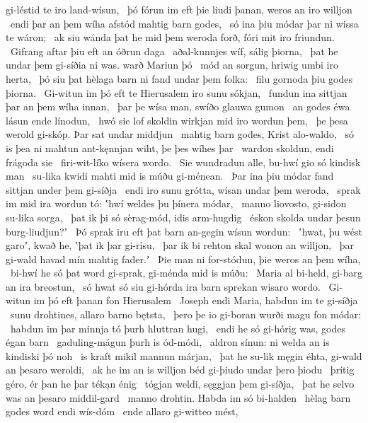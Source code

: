 gi-léstid te iro land-wísun, \hld\ þó fórun im eft þie liudi þanan,
weros an iro willjon \hld\ endi þar an þem wíha afstód
mahtig barn godes, \hld\ só ina þiu módar þar
ni wissa te wáron; \hld\ ak siu wánda þat he mid þem weroda forð,
fóri mit iro friundun. \hld\ Gifrang aftar þiu
eft an óðrun daga \hld\ aðal-kunnjes wíf,
sálig þiorna, \hld\ þat he undar þem gi-síðia ni was.
warð Mariun þó \hld\ mód an sorgun,
hriwig umbi iro herta, \hld\ þó siu þat hèlaga barn
ni fand undar þem folka: \hld\ filu gornoda
þiu godes þiorna. \hld\ Gi-witun im þó eft te Hierusalem
iro sunu sókjan, \hld\ fundun ina sittjan þar
an þem wíha innan, \hld\ þar þe wísa man,
swíðo glauwa gumon \hld\ an godes éwa
lásun ende línodun, \hld\ hwó sie lof skoldin
wirkjan mid iro wordun þem, \hld\ þe þesa werold gi-skóp.
Þar sat undar middjun \hld\ mahtig barn godes,
Krist alo-waldo, \hld\ só is þea ni mahtun ant-kęnnjan wiht,
þe þes wíhes þar \hld\ wardon skoldun,
endi frágoda sie \hld\ firi-wit-líko
wísera wordo. \hld\ Sie wundradun alle,
bu-hwí gio só kindisk man \hld\ su-lika kwidi mahti
mid is múðu gi-ménean. \hld\ Þar ina þiu módar fand
sittjan under þem gi-síðja \hld\ endi iro sunu grótta,
wísan undar þem weroda, \hld\ sprak im mid ira wordun tó:
ʽhwí weldes þu þínera módar, \hld\ manno liovosto,
gi-sidon su-lika sorga, \hld\ þat ik þi só sèrag-mód,
idis arm-hugdig \hld\ éskon skolda
undar þesun burg-liudjun?ʼ \hld\ Þó sprak iru eft þat barn an-gegin
wísun wordun: \hld\ ʽhwat, þu wést garoʼ, kwað he,
ʽþat ik þar gi-rísu, \hld\ þar ik bi rehton skal
wonon an willjon, \hld\ þar gi-wald havad
mín mahtig fader.ʼ \hld\ Þie man ni for-stódun,
þie weros an þem wíha, \hld\ bi-hwí he só þat word gi-sprak,
gi-ménda mid is múðu: \hld\ Maria al bi-held,
gi-barg an ira breostun, \hld\ só hwat só siu gi-hórda ira barn sprekan
wisaro wordo. \hld\ Gi-witun im þó eft þanan
fon Hierusalem \hld\ Joseph endi Maria,
habdun im te gi-síðja \hld\ sunu drohtines,
allaro barno bętsta, \hld\ þero þe io gi-boran wurði
magu fon módar: \hld\ habdun im þar minnja tó
þurh hluttran hugi, \hld\ endi he só gi-hórig was,
godes égan barn \hld\ gaduling-mágun
þurh is ód-módi, \hld\ aldron sínun:
ni welda an is kindiski þó noh \hld\ is kraft mikil
mannun márjan, \hld\ þat he su-lik męgin éhta,
gi-wald an þesaro weroldi, \hld\ ak he im an is willjon béd
gi-þiudo undar þero þiodu \hld\ þrítig géro,
ér þan he þar tékạn énig \hld\ tógjan weldi,
sęggjan þem gi-síðja, \hld\ þat he selvo was
an þesaro middil-gard \hld\ manno drohtin.
Habda im só bi-halden \hld\ hèlag barn godes
word endi wís-dóm \hld\ ende allaro gi-witteo mést,
